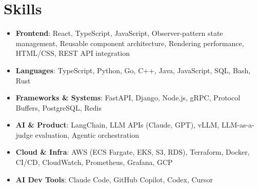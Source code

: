 \documentclass[letterpaper,11pt]{article}
\newcommand{\resumeSubHeadingListStart}{\begin{itemize}[leftmargin=0.15in, label={}]}
\newcommand{\resumeSubHeadingListEnd}{\end{itemize}}
\newcommand{\resumeSkillHeading}[2]{%
  \item\small{\textbf{#1}: #2 \vspace{-9pt}}%
}
\begin{document}
\section{Skills}
  \resumeSubHeadingListStart
    \resumeSkillHeading{Frontend}{React, TypeScript, JavaScript, Observer-pattern state management, Reusable component architecture, Rendering performance, HTML/CSS, REST API integration}
    \resumeSkillHeading{Languages}{TypeScript, Python, Go, C++, Java, JavaScript, SQL, Bash, Rust}
    \resumeSkillHeading{Frameworks \& Systems}{FastAPI, Django, Node.js, gRPC, Protocol Buffers, PostgreSQL, Redis}
    \resumeSkillHeading{AI \& Product}{LangChain, LLM APIs (Claude, GPT), vLLM, LLM-as-a-judge evaluation, Agentic orchestration}
    \resumeSkillHeading{Cloud \& Infra}{AWS (ECS Fargate, EKS, S3, RDS), Terraform, Docker, CI/CD, CloudWatch, Prometheus, Grafana, GCP}
    \resumeSkillHeading{AI Dev Tools}{Claude Code, GitHub Copilot, Codex, Cursor}
  \resumeSubHeadingListEnd
\end{document}
